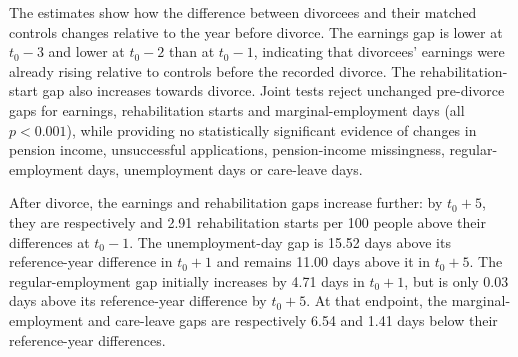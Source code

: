 \documentclass[a4paper,12pt]{article}
\theoremstyle{plain}
\theoremstyle{definition}
\theoremstyle{TheoremNum}
\theoremstyle{CorollaryNum}
\theoremstyle{PropositionNum}
\theoremstyle{TheoremNum}
\begin{document}



The estimates show how the difference between divorcees and their matched controls changes relative to the year before divorce. The earnings gap is  lower at $t_0-3$ and  lower at $t_0-2$ than at $t_0-1$, indicating that divorcees' earnings were already rising relative to controls before the recorded divorce. The rehabilitation-start gap also increases towards divorce. Joint tests reject unchanged pre-divorce gaps for earnings, rehabilitation starts and marginal-employment days (all $p<0.001$), while providing no statistically significant evidence of changes in pension income, unsuccessful applications, pension-income missingness, regular-employment days, unemployment days or care-leave days.

After divorce, the earnings and rehabilitation gaps increase further: by $t_0+5$, they are respectively  and 2.91 rehabilitation starts per 100 people above their differences at $t_0-1$. The unemployment-day gap is 15.52 days above its reference-year difference in $t_0+1$ and remains 11.00 days above it in $t_0+5$. The regular-employment gap initially increases by 4.71 days in $t_0+1$, but is only 0.03 days above its reference-year difference by $t_0+5$. At that endpoint, the marginal-employment and care-leave gaps are respectively 6.54 and 1.41 days below their reference-year differences.
\end{document}
